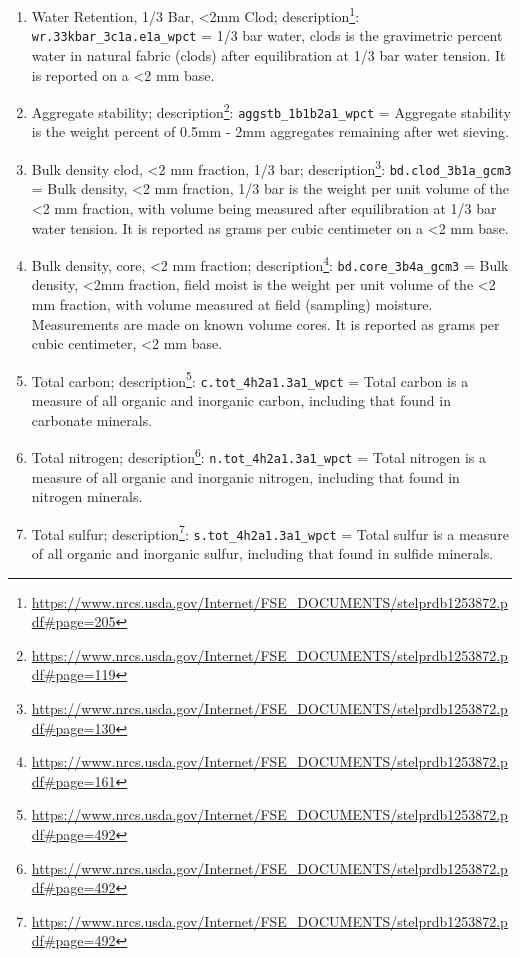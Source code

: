 \documentclass[
  graybox,natbib,nospthms]{svmono}
\renewcommand{\href}[2]{#2 (\url{#1})}
\renewcommand{\href}[2]{#2\footnote{\url{#1}}}
\begin{document}
\begin{enumerate}
\item
  Water Retention, 1/3 Bar, \textless2mm Clod; \href{https://www.nrcs.usda.gov/Internet/FSE_DOCUMENTS/stelprdb1253872.pdf\#page=205}{description}: \texttt{wr.33kbar\_3c1a.e1a\_wpct} = 1/3 bar water, clods is the gravimetric percent water in natural fabric (clods) after equilibration at 1/3 bar water tension. It is reported on a \textless2 mm base.\\
\item
  Aggregate stability; \href{https://www.nrcs.usda.gov/Internet/FSE_DOCUMENTS/stelprdb1253872.pdf\#page=119}{description}: \texttt{aggstb\_1b1b2a1\_wpct} = Aggregate stability is the weight percent of 0.5mm - 2mm aggregates remaining after wet sieving.
\item
  Bulk density clod, \textless2 mm fraction, 1/3 bar; \href{https://www.nrcs.usda.gov/Internet/FSE_DOCUMENTS/stelprdb1253872.pdf\#page=130}{description}: \texttt{bd.clod\_3b1a\_gcm3} = Bulk density, \textless2 mm fraction, 1/3 bar is the weight per unit volume of the \textless2 mm fraction, with volume being measured after equilibration at 1/3 bar water tension. It is reported as grams per cubic centimeter on a \textless2 mm base.\\
\item
  Bulk density, core, \textless2 mm fraction; \href{https://www.nrcs.usda.gov/Internet/FSE_DOCUMENTS/stelprdb1253872.pdf\#page=161}{description}: \texttt{bd.core\_3b4a\_gcm3} = Bulk density, \textless2mm fraction, field moist is the weight per unit volume of the \textless2 mm fraction, with volume measured at field (sampling) moisture. Measurements are made on known volume cores. It is reported as grams per cubic centimeter, \textless2 mm base.\\
\item
  Total carbon; \href{https://www.nrcs.usda.gov/Internet/FSE_DOCUMENTS/stelprdb1253872.pdf\#page=492}{description}: \texttt{c.tot\_4h2a1.3a1\_wpct} = Total carbon is a measure of all organic and inorganic carbon, including that found in carbonate minerals.\\
\item
  Total nitrogen; \href{https://www.nrcs.usda.gov/Internet/FSE_DOCUMENTS/stelprdb1253872.pdf\#page=492}{description}: \texttt{n.tot\_4h2a1.3a1\_wpct} = Total nitrogen is a measure of all organic and inorganic nitrogen, including that found in nitrogen minerals.\\
\item
  Total sulfur; \href{https://www.nrcs.usda.gov/Internet/FSE_DOCUMENTS/stelprdb1253872.pdf\#page=492}{description}: \texttt{s.tot\_4h2a1.3a1\_wpct} = Total sulfur is a measure of all organic and inorganic sulfur, including that found in sulfide minerals.\\

\end{enumerate}
\end{document}
